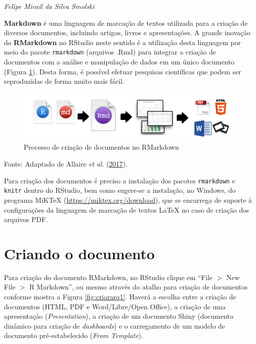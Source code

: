 \documentclass[12pt,brazil,oneside]{book}
\begin{document}
\emph{Felipe Micail da Silva Smolski}

\begin{flushright}
\emph{}
\end{flushright}

\textbf{Markdown} é uma linguagem de marcação de textos utilizada para a criação de diversos documentos, incluindo artigos, livros e apresentações. A grande inovação do \textbf{RMarkdown} no RStudio neste sentido é a utilização desta linguagem por meio do pacote \texttt{rmarkdown} (arquivos .Rmd) para integrar a criação de documentos com a análise e manipulação de dados em um único documento (Figura \ref{fig:rmark}). Desta forma, é possível efetuar pesquisas científicas que podem ser reproduzidas de forma muito mais fácil.

\begin{figure}[H]

{\centering \includegraphics[width=0.7\linewidth]{rmarkdown} 

}

\caption{Processo de criação de documentos no RMarkdown}\label{fig:rmark}
\end{figure}

Fonte: Adaptado de Allaire \emph{et al.} (\protect\hyperlink{ref-R-rmarkdown}{2017}).

Para criação dos documentos é preciso a instalação dos pacotes \texttt{rmarkdown} e \texttt{knitr} dentro do RStudio, bem como sugere-se a instalação, no Windows, do programa MiKTeX (\url{https://miktex.org/download}), que se encarrega de suporte à configurações da linguagem de marcação de textos LaTeX no caso de criação dos arquivos PDF.

\hypertarget{criando-o-documento}{%
\section{Criando o documento}\label{criando-o-documento}}

Para criação do documento RMarkdown, no RStudio clique em ``File \(>\) New File \(>\) R Markdown'', ou mesmo através do atalho para criação de documentos conforme mostra a Figura \ref{fig:criararq1}. Haverá a escolha entre a criação de documentos (HTML, PDF e Word/Libre/Open Office), a criação de uma apresentação (\emph{Presentation}), a criação de um documento Shiny (documento dinâmico para criação de \emph{dashboards}) e o carregamento de um modelo de documento pré-estabelecido (\emph{From Template}).
\end{document}
